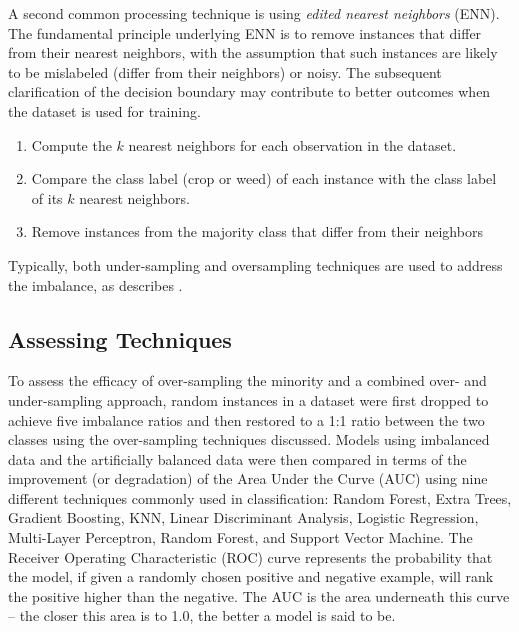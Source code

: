 \documentclass[letterpaper]{report}
\begin{document}
A second common processing technique is using \textit{edited nearest neighbors} (ENN). The fundamental principle underlying ENN is to remove instances that differ from their nearest neighbors, with the assumption that such instances are likely to be mislabeled (differ from their neighbors) or noisy. The subsequent clarification of the decision boundary may contribute to better outcomes when the dataset is used for training.
\begin{enumerate}
\item{Compute the $k$ nearest neighbors for each observation in the dataset.}
\item{Compare the class label (crop or weed) of each instance with the class label of its $k$ nearest neighbors.}
\item{Remove instances from the majority class that differ from their neighbors}
\end{enumerate}

Typically, both under-sampling and oversampling techniques are used to address the imbalance, as \citeauthor{Batista2004-qz} describes \parencite{Batista2004-qz}. 

\subsection{Assessing Techniques}
To assess the efficacy of over-sampling the minority and a combined over- and under-sampling approach, random instances in a dataset were first dropped to achieve five imbalance ratios and then restored to a 1:1 ratio between the two classes using the over-sampling techniques discussed. Models using imbalanced data and the artificially balanced data were then compared in terms of the improvement (or degradation) of the Area Under the Curve (AUC) using nine different techniques commonly used in classification: Random Forest, Extra Trees, Gradient Boosting, KNN, Linear Discriminant Analysis, Logistic Regression, Multi-Layer Perceptron, Random Forest, and Support Vector Machine. The Receiver Operating Characteristic (ROC) curve represents the probability that the model, if given a randomly chosen positive and negative example, will rank the positive higher than the negative. The AUC is the area underneath this curve -- the closer this area is to 1.0, the better a model is said to be.
\end{document}
